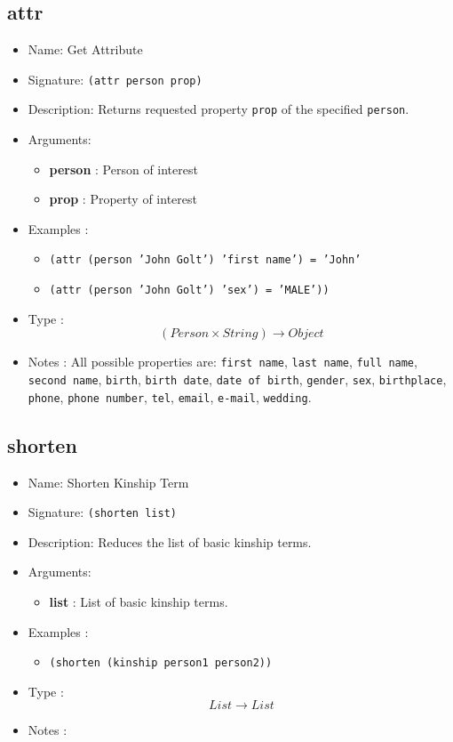 \subsection{attr}
\label{doc:attr}
\begin{itemize}
    \item Name: Get Attribute
    \item Signature: \texttt{(attr person prop)}
    \item Description: Returns requested property \texttt{prop} of the specified \texttt{person}.
    \item Arguments:
        \begin{itemize}
            \item \textbf{person} : Person of interest
            \item \textbf{prop} : Property of interest
        \end{itemize}
    \item Examples :
        \begin{itemize}
            \item \texttt{(attr (person 'John Golt') 'first name') = 'John'}
            \item \texttt{(attr (person 'John Golt') 'sex') = 'MALE'))}
        \end{itemize}
    \item Type : \[(Person \times String) \to Object\]
    \item Notes : All possible properties are: \texttt{first name}, \texttt{last name}, \texttt{full name}, \texttt{second name},
        \texttt{birth}, \texttt{birth date}, \texttt{date of birth}, \texttt{gender}, \texttt{sex}, \texttt{birthplace}, \texttt{phone}, \texttt{phone number}, \texttt{tel}, \texttt{email}, \texttt{e-mail}, \texttt{wedding}.
\end{itemize}

\subsection{shorten}
\begin{itemize}
    \item Name: Shorten Kinship Term
    \item Signature: \texttt{(shorten list)}
    \item Description: Reduces the list of basic kinship terms.
    \item Arguments:
        \begin{itemize}
            \item \textbf{list} : List of basic kinship terms.
        \end{itemize}
    \item Examples :
        \begin{itemize}
            \item \texttt{(shorten (kinship person1 person2))}
        \end{itemize}
    \item Type : \[List \to List\]
    \item Notes :
\end{itemize}

